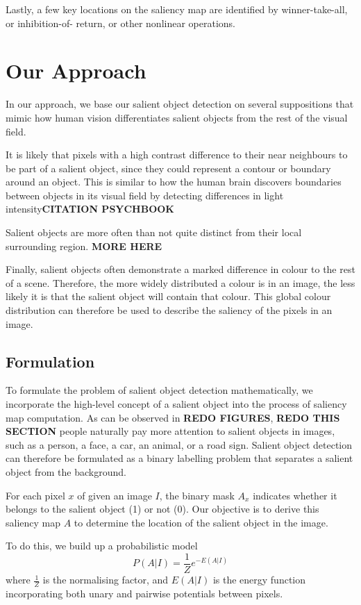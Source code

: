 \documentclass[10pt,twocolumn,letterpaper]{article}
\newcommand{\BOLD}{\textbf}
\begin{document}
Lastly, a few key locations on the saliency map are identified by winner-take-all, or inhibition-of- return, or other nonlinear operations.
\section{Our Approach}

In our approach, we base our salient object detection on several suppositions that mimic how human vision differentiates salient objects from the rest of the visual field.

It is likely that pixels with a high contrast difference to their near neighbours to be part of a salient object, since they could represent a contour or boundary around an object.  This is similar to how the human brain discovers boundaries between objects in its visual field by detecting differences in light intensity\BOLD{CITATION PSYCHBOOK}

Salient objects are more often than not quite distinct from their local surrounding region.  \BOLD{MORE HERE}

Finally, salient objects often demonstrate a marked difference in colour to the rest of a scene.  Therefore, the more widely distributed a colour is in an image, the less likely it is that the salient object will contain that colour.  This global colour distribution can therefore be used to describe the saliency of the pixels in an image.

\subsection{Formulation}

To formulate the problem of salient object detection mathematically, we incorporate the high-level concept of a salient object into the process of saliency map computation. As can be observed in \BOLD{REDO FIGURES}, \BOLD{REDO THIS SECTION} people naturally pay more attention to salient objects in images, such as a person, a face, a car, an animal, or a road sign. Salient object detection can therefore be formulated as a binary labelling problem that separates a salient object from the background. 

For each pixel $x$ of given an image $I$, the binary mask $A_x$ indicates whether it belongs to the salient object (1) or not (0). Our objective is to derive this saliency map $A$ to determine the location of the salient object in the image.

To do this, we build up a probabilistic model $$P(A|I)=\frac{1}{Z}e^{-E(A|I)}$$ where $\frac{1}{Z}$ is the normalising factor, and $E(A|I)$ is the energy function incorporating both unary and pairwise potentials between pixels.
\end{document}
